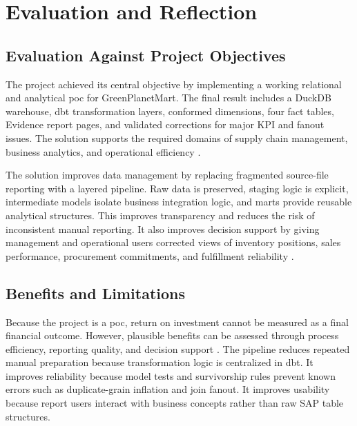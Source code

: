 \section{Evaluation and Reflection}

\subsection{Evaluation Against Project Objectives}

The project achieved its central objective by implementing a working relational and analytical \ac{poc} for GreenPlanetMart. The final result includes a DuckDB warehouse, \ac{dbt} transformation layers, conformed dimensions, four fact tables, Evidence report pages, and validated corrections for major KPI and fanout issues. The solution supports the required domains of supply chain management, business analytics, and operational efficiency \parencite{william_h_delone_delone_2003}.

The solution improves data management by replacing fragmented source-file reporting with a layered pipeline. Raw data is preserved, staging logic is explicit, intermediate models isolate business integration logic, and marts provide reusable analytical structures. This improves transparency and reduces the risk of inconsistent manual reporting. It also improves decision support by giving management and operational users corrected views of inventory positions, sales performance, procurement commitments, and fulfillment reliability \parencite{william_h_delone_delone_2003}.

\subsection{Benefits and Limitations}

Because the project is a \ac{poc}, return on investment cannot be measured as a final financial outcome. However, plausible benefits can be assessed through process efficiency, reporting quality, and decision support \parencite{william_h_delone_delone_2003}. The pipeline reduces repeated manual preparation because transformation logic is centralized in \ac{dbt}. It improves reliability because model tests and survivorship rules prevent known errors such as duplicate-grain inflation and join fanout. It improves usability because report users interact with business concepts rather than raw SAP table structures.

